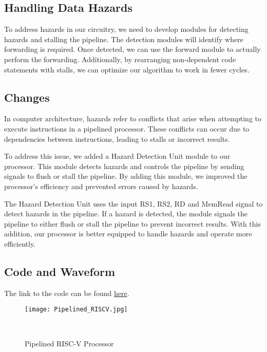 \documentclass{report}
\begin{document}
\subsection{Handling Data Hazards}

To address hazards in our circuitry, we need to develop modules for detecting hazards and stalling the pipeline. The detection modules will identify where forwarding is required. Once detected, we can use the forward module to actually perform the forwarding. Additionally, by rearranging non-dependent code statements with stalls, we can optimize our algorithm to work in fewer cycles.

\subsection{Changes}

In computer architecture, hazards refer to conflicts that arise when attempting to execute instructions in a pipelined processor. These conflicts can occur due to dependencies between instructions, leading to stalls or incorrect results.

To address this issue, we added a Hazard Detection Unit module to our processor. This module detects hazards and controls the pipeline by sending signals to flush or stall the pipeline. By adding this module, we improved the processor's efficiency and prevented errors caused by hazards.


The Hazard Detection Unit uses the input RS1, RS2, RD and MemRead signal to detect hazards in the pipeline. If a hazard is detected, the module signals the pipeline to either flush or stall the pipeline to prevent incorrect results. With this addition, our processor is better equipped to handle hazards and operate more efficiently.



\subsection{Code and Waveform}
The link to the code can be found \href{https://github.com/NehalNN10/CA-final-project/blob/5b606f284db6f33765f0c830730e5cee43c01f18/final_project/final_project.srcs/sources_1/new/hazardProcessor.v}{here}.

\begin{figure}[h!]
    \centerline{\texttt{[image: Pipelined\_RISCV.jpg]}}
    \caption{Pipelined RISC-V Processor}

  \end{figure}
  
\end{document}
